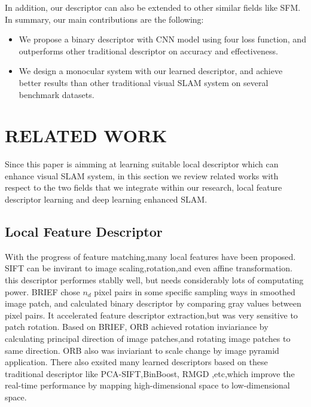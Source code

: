 \documentclass{svproc}
\begin{document}
In addition, our descriptor can also be extended to other similar fields like SFM. In summary, our main contributions are the following:
\begin{itemize}
\item We propose a binary descriptor with CNN model using four loss function, and outperforms other traditional descriptor on accuracy and effectiveness. 
\item We design a monocular system with our learned descriptor, and achieve better results than other traditional visual SLAM system on several benchmark datasets.
\end{itemize}

\section{RELATED WORK}
Since this paper is aimming at learning suitable local descriptor which can enhance visual SLAM system, in this section we review related works with respect to the two fields that we integrate within our research, local feature descriptor learning and deep learning enhanced SLAM.

\subsection{Local Feature Descriptor}
With the progress of feature matching,many local features have been proposed. 
SIFT\cite{c6} can be invirant to image scaling,rotation,and even affine transformation. this descriptor performes stablly well, but needs considerably lots of computating power. 
BRIEF\cite{c7} chose $n_{d}$ pixel pairs in some specific sampling ways in smoothed image patch, and calculated binary descriptor by comparing gray values between pixel pairs. It accelerated feature descriptor extraction,but was very sensitive to patch rotation.  
Based on BRIEF, ORB\cite{c8} achieved rotation inviariance by calculating principal direction of image patches,and rotating image patches to same direction. ORB also was inviariant to scale change by image pyramid application.
There also exsited many learned descriptors based on these traditional descriptor like PCA-SIFT\cite{c9},BinBoost\cite{c10}, RMGD\cite{c11} ,etc,which improve the real-time performance by mapping high-dimensional space to low-dimensional space. 
\end{document}
